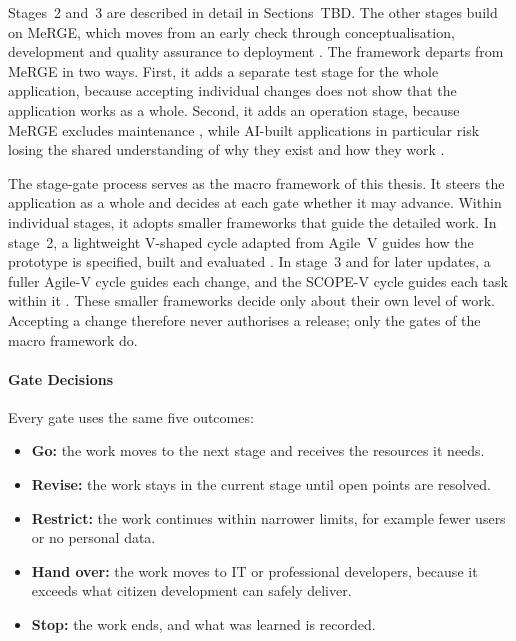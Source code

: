 \documentclass[10pt,a4paper]{article}
\begin{document}
Stages~2 and~3 are described in detail in Sections~TBD. The other stages build on MeRGE, which moves from an early check through conceptualisation, development and quality assurance to deployment \parencite{fetzer2026}. The framework departs from MeRGE in two ways. First, it adds a separate test stage for the whole application, because accepting individual changes does not show that the application works as a whole. Second, it adds an operation stage, because MeRGE excludes maintenance \parencite{fetzer2026}, while AI-built applications in particular risk losing the shared understanding of why they exist and how they work \parencite{storey2026}.

The stage-gate process serves as the macro framework of this thesis. It steers the application as a whole and decides at each gate whether it may advance. Within individual stages, it adopts smaller frameworks that guide the detailed work. In stage~2, a lightweight V-shaped cycle adapted from Agile~V guides how the prototype is specified, built and evaluated \parencite{koch2026agile}. In stage~3 and for later updates, a fuller Agile-V cycle guides each change, and the SCOPE-V cycle guides each task within it \parencite{koch2026agile,koch2026agentic}. These smaller frameworks decide only about their own level of work. Accepting a change therefore never authorises a release; only the gates of the macro framework do.

\paragraph{Gate Decisions}

Every gate uses the same five outcomes:

\begin{itemize}
    \item \textbf{Go:} the work moves to the next stage and receives the resources it needs.
    \item \textbf{Revise:} the work stays in the current stage until open points are resolved.
    \item \textbf{Restrict:} the work continues within narrower limits, for example fewer users or no personal data.
    \item \textbf{Hand over:} the work moves to IT or professional developers, because it exceeds what citizen development can safely deliver.
    \item \textbf{Stop:} the work ends, and what was learned is recorded.
\end{itemize}
\end{document}
